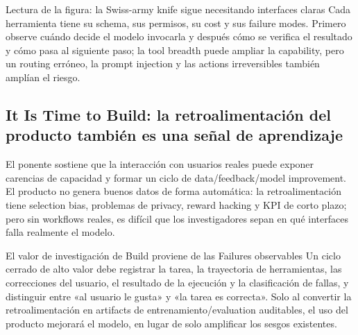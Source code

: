 
\begin{knowledgebox}{Lectura de la figura: la Swiss-army knife sigue necesitando interfaces claras}
Cada herramienta tiene su schema, sus permisos, su cost y sus failure modes. Primero observe cuándo decide el modelo invocarla y después cómo se verifica el resultado y cómo pasa al siguiente paso; la tool breadth puede ampliar la capability, pero un routing erróneo, la prompt injection y las actions irreversibles también amplían el riesgo.
\end{knowledgebox}


\subsection{It Is Time to Build: la retroalimentación del producto también es una señal de aprendizaje}

El ponente sostiene que la interacción con usuarios reales puede exponer carencias de capacidad y formar un ciclo de data/feedback/model improvement. El producto no genera buenos datos de forma automática: la retroalimentación tiene selection bias, problemas de privacy, reward hacking y KPI de corto plazo; pero sin workflows reales, es difícil que los investigadores sepan en qué interfaces falla realmente el modelo.


\begin{importantbox}{El valor de investigación de Build proviene de las Failures observables}
Un ciclo cerrado de alto valor debe registrar la tarea, la trayectoria de herramientas, las correcciones del usuario, el resultado de la ejecución y la clasificación de fallas, y distinguir entre «al usuario le gusta» y «la tarea es correcta». Solo al convertir la retroalimentación en artifacts de entrenamiento/evaluation auditables, el uso del producto mejorará el modelo, en lugar de solo amplificar los sesgos existentes.
\end{importantbox}

